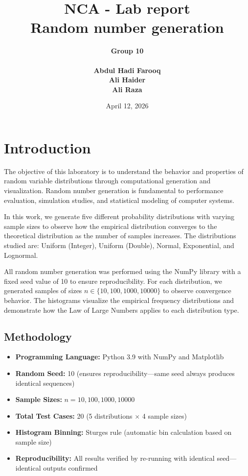 \documentclass[12pt]{article}
\title{NCA - Lab report \\

Random number generation
}
\author{\bf{Group 10} \\ \\
        Abdul Hadi Farooq \\
        Ali Haider \\
        Ali Raza \\
}
\date{April 12, 2026}
\begin{document}
\maketitle

\section{Introduction}

The objective of this laboratory is to understand the behavior and properties of random variable distributions through computational generation and visualization. Random number generation is fundamental to performance evaluation, simulation studies, and statistical modeling of computer systems.

In this work, we generate five different probability distributions with varying sample sizes to observe how the empirical distribution converges to the theoretical distribution as the number of samples increases. The distributions studied are: Uniform (Integer), Uniform (Double), Normal, Exponential, and Lognormal.

All random number generation was performed using the NumPy library with a fixed seed value of 10 to ensure reproducibility. For each distribution, we generated samples of sizes $n \in \{10, 100, 1000, 10000\}$ to observe convergence behavior. The histograms visualize the empirical frequency distributions and demonstrate how the Law of Large Numbers applies to each distribution type.

\subsection{Methodology}

\begin{itemize}
    \item \textbf{Programming Language:} Python 3.9 with NumPy and Matplotlib
    \item \textbf{Random Seed:} 10 (ensures reproducibility---same seed always produces identical sequences)
    \item \textbf{Sample Sizes:} $n = 10, 100, 1000, 10000$
    \item \textbf{Total Test Cases:} 20 (5 distributions $\times$ 4 sample sizes)
    \item \textbf{Histogram Binning:} Sturges rule (automatic bin calculation based on sample size)
    \item \textbf{Reproducibility:} All results verified by re-running with identical seed---identical outputs confirmed
\end{itemize}
\end{document}
